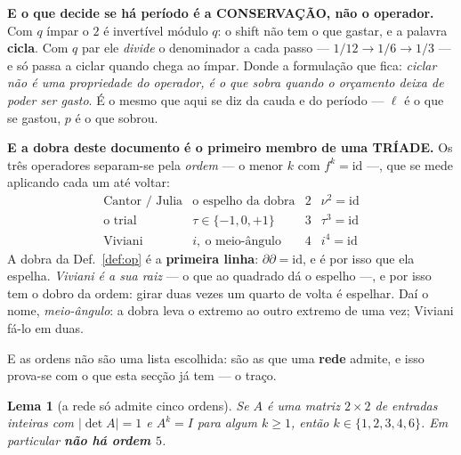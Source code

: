 \documentclass[11pt,a4paper]{article}
\newtheorem{lema}[teorema]{Lema}
\begin{document}
\medskip\noindent\textbf{E o que decide se há período é a CONSERVAÇÃO, não o
operador.} Com $q$ ímpar o $2$ é invertível módulo $q$: o shift não tem o que
gastar, e a palavra \textbf{cicla}. Com $q$ par ele \emph{divide} o denominador
a cada passo --- $1/12\to1/6\to1/3$ --- e só passa a ciclar quando chega ao
ímpar. Donde a formulação que fica: \emph{ciclar não é uma propriedade do
operador, é o que sobra quando o orçamento deixa de poder ser gasto}. É o mesmo
que aqui se diz da cauda e do período --- $\ell$ é o
que se gastou, $p$ é o que sobrou.

\medskip\noindent\textbf{E a dobra deste documento é o primeiro membro de uma
TRÍADE.} Os três operadores separam-se pela \emph{ordem} --- o menor $k$ com
$f^{k}=\mathrm{id}$ ---, que se mede aplicando cada um até voltar:
\[
\begin{array}{llcl}
\text{Cantor / Julia} & \text{o espelho da dobra} & 2 & \nu^{2}=\mathrm{id}\\
\text{o trial} & \tau\in\{-1,0,+1\} & 3 & \tau^{3}=\mathrm{id}\\
\text{Viviani} & i,\ \text{o meio-ângulo} & 4 & i^{4}=\mathrm{id}
\end{array}
\]
A dobra da Def.~\ref{def:op} é a \textbf{primeira linha}: $\partial\partial=
\mathrm{id}$, e é por isso que ela espelha. \emph{Viviani é a sua raiz} --- o
que ao quadrado dá o espelho ---, e por isso tem o dobro da ordem: girar duas
vezes um quarto de volta é espelhar. Daí o nome, \emph{meio-ângulo}: a dobra
leva o extremo ao outro extremo de uma vez; Viviani fá-lo em duas.

\medskip\noindent E as ordens não são uma lista escolhida: são as que uma
\textbf{rede} admite, e isso prova-se com o que esta secção já tem --- o traço.

\begin{lema}[a rede só admite cinco ordens]\label{lem:cristal}
Se $A$ é uma matriz $2\times2$ de entradas \emph{inteiras} com
$\lvert\det A\rvert=1$ e $A^{k}=I$ para algum $k\ge1$, então
$k\in\{1,2,3,4,6\}$. Em particular \textbf{não há ordem $5$}.
\end{lema}
\end{document}

